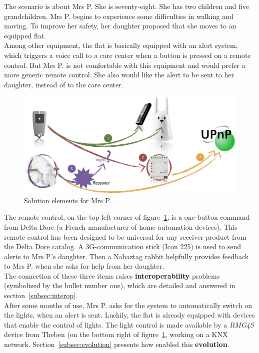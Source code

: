 The scenario is about Mrs P. She is seventy-eight. She has two children and five grandchildren. Mrs P. begins to experience some difficulties in walking and moving. To improve her safety, her daughter proposed that she moves to an equipped flat.\\
Among other equipment, the flat is basically equipped with an alert system, which triggers a voice call to a care center when a button is pressed on a remote control. But Mrs P. is not comfortable with this equipment and would prefer a more generic remote control. She also would like the alert to be sent to her daughter, instead of to the care center.\\

\begin{figure}[h!]
\centering
\includegraphics[width=.7\textwidth]{part4/pics/ConcreteApplication}
\caption{Solution elements for Mrs P.}
\label{fig:concreteApplication}
\end{figure}

The remote control, on the top left corner of figure~\ref{fig:concreteApplication}, is a one-button command from Delta Dore (a French manufacturer of home automation devices). This remote control has been designed to be universal for any receiver product from the Delta Dore catalog. A 3G-communication stick (Icon 225) is used to send alerts to Mrs P.'s daughter. Then a Nabaztag rabbit helpfully provides feedback to Mrs P. when she asks for help from her daughter.\\
The connection of these three items raises {\bf interoperability} problems (symbolized by the bullet number one), which are detailed and answered in section~\ref{subsec:interop}.\\

After some months of use, Mrs P. asks for the system to automatically switch on the lights, when an alert is sent. Luckily, the flat is already equipped with devices that enable the control of lights. The light control is made available by a \textit{RMG4S} device from Theben (on the bottom right of figure~\ref{fig:concreteApplication}, working on a KNX network. Section~\ref{subsec:evolution} presents how \enti{} enabled this {\bf evolution}.\\

